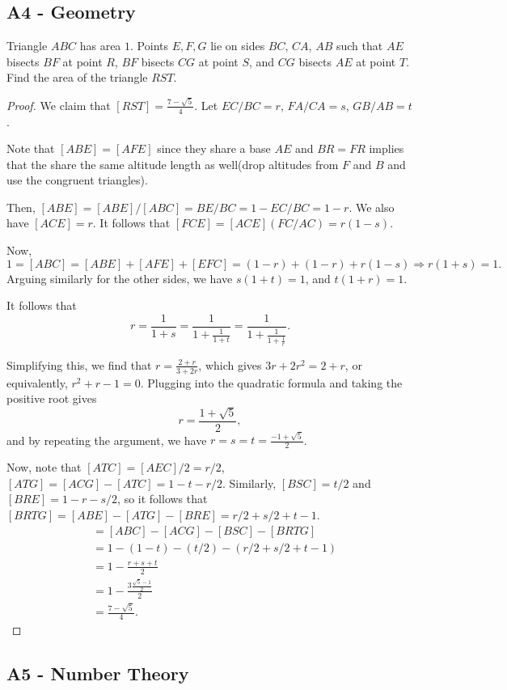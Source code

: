 \documentclass[11pt]{scrartcl}
\begin{document}
\subsection{A4 - Geometry}
\begin{Prob}[2001 - A4] Triangle $ABC$ has area $1$.  Points $E, F, G$ lie on sides $BC$, $CA$, $AB$ such that $AE$ bisects $BF$ at point $R$, $BF$ bisects $CG$ at point $S$, and $CG$ bisects $AE$ at point $T$.  Find the area of the triangle $RST$.
\end{Prob}
\begin{proof}
We claim that $[RST] = \frac{7- \sqrt{5}}{4}.$
Let $EC/BC = r$, $FA/CA = s$, $GB/AB = t$.

Note that $[ABE] = [AFE]$ since they share a base $AE$ and $BR = FR$ implies that the share the same altitude length as well(drop altitudes from $F$ and $B$ and use the congruent triangles).  

Then, $[ABE] = [ABE]/[ABC]= BE/BC = 1 - EC/BC = 1-r$.  We also have $[ACE] = r$.  It follows that $[FCE] = [ACE] (FC/AC) = r(1-s)$.

Now,
$$1 = [ABC] = [ABE] + [AFE] + [EFC] = (1-r) + (1-r) + r(1-s) \Longrightarrow r(1+s) = 1.$$
Arguing similarly for the other sides, we have $s(1+t) = 1$, and $t(1+r) = 1$.  

It follows that 
$$r = \frac{1}{1+s} = \frac{1}{1 + \frac{1}{1+t}} = \frac{1}{1 + \frac{1}{1 + \frac{1}{r}}}.$$

Simplifying this, we find that $r = \frac{2+r}{3 + 2r}$, which gives $3r + 2r^2 = 2+ r$, or equivalently, $r^2 + r - 1 = 0$.  Plugging into the quadratic formula and taking the positive root gives
$$r =\frac{1 + \sqrt{5}}{2},$$
and by repeating the argument, we have $r = s = t = \frac{-1 + \sqrt{5}}{2}$.  

Now, note that $[ATC] = [AEC] / 2 = r/2$, $[ATG] = [ACG] - [ATC] = 1 - t - r/2$.  Similarly, $[BSC] = t/2$ and $[BRE] = 1 - r - s/2$, so it follows that $[BRTG] = [ABE] - [ATG] - [BRE] = r/2 + s/2 + t - 1$.
\begin{align*}
[RST] &= [ABC] - [ACG] - [BSC] - [BRTG] \\
&= 1 - (1 - t) - (t/2) - (r/2 + s/2 + t - 1)\\
&= 1 - \frac{r + s + t}{2} \\
&= 1 - \frac{3\frac{\sqrt{5} - 1}{2}}{2} \\
&= \frac{7 - \sqrt{5}}{4}.
\end{align*}
\end{proof}
\subsection{A5 - Number Theory}
\begin{Prob}[2001 - A5]
\end{Prob}
\end{document}
